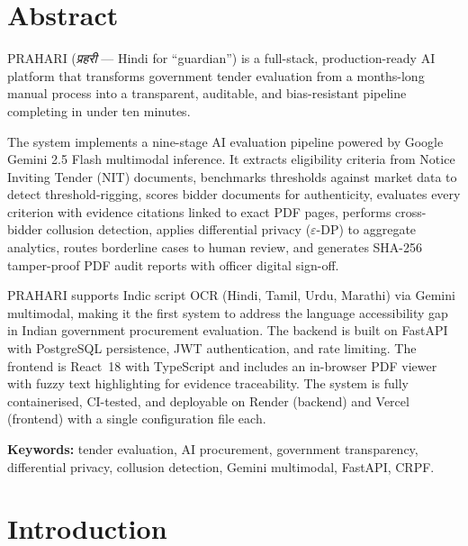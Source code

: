 \documentclass[12pt,a4paper]{article}
\begin{document}
\tableofcontents
\newpage

\section*{Abstract}

PRAHARI (\textit{प्रहरी} — Hindi for \enquote{guardian}) is a full-stack, production-ready
AI platform that transforms government tender evaluation from a months-long manual
process into a transparent, auditable, and bias-resistant pipeline completing in
under ten minutes.

The system implements a nine-stage AI evaluation pipeline powered by Google Gemini
2.5 Flash multimodal inference. It extracts eligibility criteria from Notice Inviting
Tender (NIT) documents, benchmarks thresholds against market data to detect
threshold-rigging, scores bidder documents for authenticity, evaluates every criterion
with evidence citations linked to exact PDF pages, performs cross-bidder collusion
detection, applies differential privacy ($\varepsilon$-DP) to aggregate analytics,
routes borderline cases to human review, and generates SHA-256 tamper-proof PDF audit
reports with officer digital sign-off.

PRAHARI supports Indic script OCR (Hindi, Tamil, Urdu, Marathi) via Gemini multimodal,
making it the first system to address the language accessibility gap in Indian
government procurement evaluation. The backend is built on FastAPI with PostgreSQL
persistence, JWT authentication, and rate limiting. The frontend is React~18 with
TypeScript and includes an in-browser PDF viewer with fuzzy text highlighting for
evidence traceability. The system is fully containerised, CI-tested, and deployable
on Render (backend) and Vercel (frontend) with a single configuration file each.

\textbf{Keywords:} tender evaluation, AI procurement, government transparency, differential privacy,
collusion detection, Gemini multimodal, FastAPI, CRPF.

\newpage

\section{Introduction}
\end{document}
